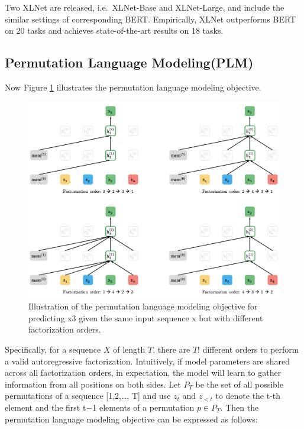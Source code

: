 \documentclass[]{krantz}
\begin{document}
Two XLNet are released, i.e.~XLNet-Base and XLNet-Large, and include the similar settings of corresponding BERT. Empirically, XLNet outperforms BERT on 20 tasks and achieves state-of-the-art results on 18 tasks.

\hypertarget{permutation-language-modelingplm}{%
\subsection{Permutation Language Modeling(PLM)}\label{permutation-language-modelingplm}}

Now Figure \ref{fig:ch02-03-figure010} illustrates the permutation language modeling objective.

\begin{figure}

{\centering \includegraphics[width=0.7\linewidth]{figures/02-03-transfer-learning-for-nlp/xlnet_pml} 

}

\caption{Illustration of the permutation language modeling objective for predicting x3 given the same input sequence x but with different factorization orders.}\label{fig:ch02-03-figure010}
\end{figure}

Specifically, for a sequence \(X\) of length \(T\), there are \(T!\) different orders to perform a valid autoregressive factorization. Intuitively, if model parameters are shared across all factorization orders, in expectation, the model will learn to gather information from all positions on both sides. Let \(P_T\) be the set of all possible permutations of a sequence {[}1,2,\ldots{}, T{]} and use \(z_t\) and \(z_{<t}\) to denote the t-th element and the first t−1 elements of a permutation \(p\in P_T\). Then the permutation language modeling objective can be expressed as follows:
\end{document}
